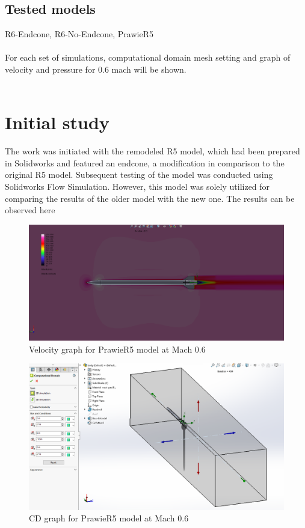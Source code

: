 \documentclass{article}
\begin{document}
\subsection{Tested models}
R6-Endcone, R6-No-Endcone, PrawieR5\\\\
For each set of simulations, computational domain mesh setting and graph of velocity and 
pressure for 0.6 mach will be shown.\\\\
\newpage
\section{Initial study}
The work was initiated with the remodeled R5 model, which had been prepared in Solidworks 
and featured an endcone, a modification in comparison to the original R5 model. Subsequent 
testing of the model was conducted using Solidworks Flow Simulation. However, this model 
was solely utilized for comparing the results of the older model with the new one. The 
results can be observed here

\begin{figure}[H]
    \centering
    \includegraphics[width=\textwidth]{../data/PrawieR5-Solid/PrawieR5-TR-Velocity-Mach06.png}
    \caption{Velocity graph for PrawieR5 model at Mach 0.6}
\end{figure}

\begin{figure}[H]
    \centering
    \includegraphics[width=\textwidth]{../data/PrawieR5-Solid/ComputationalDomain.png}
    \caption{CD graph for PrawieR5 model at Mach 0.6}
\end{figure}
\end{document}
